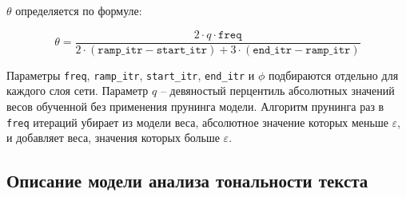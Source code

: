 \documentclass[12pt]{article}
\begin{document}
\newpage
$\theta$ определяется по формуле:

\begin{equation}
  \theta = \frac{2 \cdot q \cdot \mathtt{freq}}{2 \cdot (\mathtt{ramp\_itr} - \mathtt{start\_itr}) + 3 \cdot (\mathtt{end\_itr} - \mathtt{ramp\_itr})}
\end{equation}


Параметры \texttt{freq}, \texttt{ramp\_itr}, \texttt{start\_itr}, \texttt{end\_itr} и $\phi$ подбираются отдельно для каждого слоя сети. Параметр $q$ -- девяностый
перцентиль абсолютных значений весов обученной без применения прунинга модели. Алгоритм прунинга раз в \texttt{freq} итераций убирает из модели
веса, абсолютное значение которых меньше $\varepsilon$, и добавляет веса, значения которых больше $\varepsilon$.

\subsection*{Описание модели анализа тональности текста}
%
\end{document}
